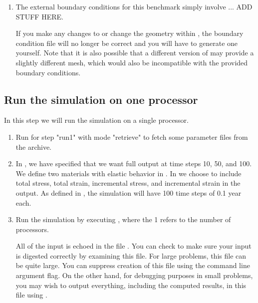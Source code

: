 \begin{enumerate}
\item The external boundary conditions for this benchmark simply
  involve ... ADD STUFF HERE.

  \begin{warning}
    If you make any changes to  or change the
    geometry within , the boundary condition file
     will no longer be correct and you will
    have to generate one yourself.  Note that it is also possible that
    a different version of  may provide a slightly
    different mesh, which would also be incompatible with the provided
    boundary conditions.
  \end{warning}
\end{enumerate}

\subsection{Run the simulation on one processor}

In this step we will run the simulation on a single processor.

\begin{enumerate}
\item Run  for step "run1" with mode "retrieve" to
  fetch some parameter files from the archive.

  \begin{screen}
    \shellprompt{}
  \end{screen}
  
\item In , we have specified that we want
  full output at time steps 10, 50, and 100. We define two materials
  with elastic behavior in
  . In  we choose to
  include total stress, total strain, incremental stress, and
  incremental strain in the output. As defined in
  , the simulation will have 100 time steps of
  0.1 year each.
\item Run the simulation by executing , where
  the 1 refers to the number of processors.

  \begin{tip}
    All of the input is echoed in the file .
    You can check to make sure your input is digested correctly by
    examining this file. For large problems, this file can be quite
    large. You can suppress creation of this file using the command
    line argument  flag. On the
    other hand, for debugging purposes in small problems, you may wish
    to output everything, including the computed results, in this file
    using .
  \end{tip}
  
  \begin{screen}
    \shellprompt{}
  \end{screen}
\end{enumerate}

